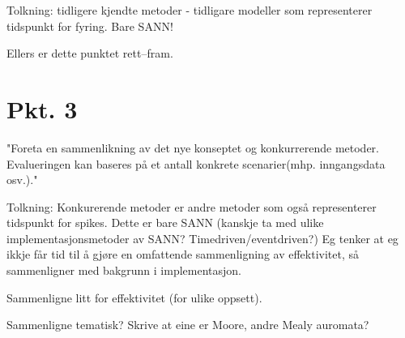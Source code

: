\documentclass[a4paper,11 pt]{report}
\begin{document}
Tolkning: tidligere kjendte metoder - tidligare modeller som representerer tidspunkt for fyring. Bare SANN!

Ellers er dette punktet rett--fram.

	\section{Pkt. 3}
"Foreta en sammenlikning av det nye konseptet og konkurrerende metoder. Evalueringen kan baseres på et antall konkrete scenarier(mhp. inngangsdata osv.)."

Tolkning:
Konkurerende metoder er andre metoder som også representerer tidspunkt for spikes. Dette er bare SANN (kanskje ta med ulike implementasjonsmetoder av SANN? Timedriven/eventdriven?)
Eg tenker at eg ikkje får tid til å gjøre en omfattende sammenligning av effektivitet, så sammenligner med bakgrunn i implementasjon. 

Sammenligne litt for effektivitet (for ulike oppsett).

Sammenligne tematisk? Skrive at eine er Moore, andre Mealy auromata?


\tableofcontents




\newpage

\newpage







\end{document}
